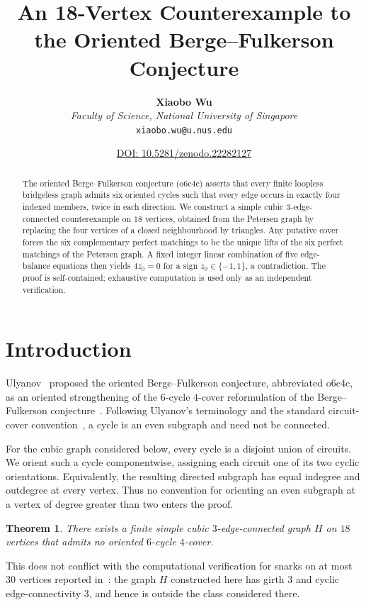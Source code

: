 \documentclass[11pt]{article}
\title{An 18-Vertex Counterexample to the
Oriented Berge--Fulkerson Conjecture}
\author{\textbf{Xiaobo Wu}\\
  \textit{Faculty of Science, National University of Singapore}\\
  \texttt{xiaobo.wu@u.nus.edu}}
\date{\small\href{https://doi.org/10.5281/zenodo.22282127}{DOI: 10.5281/zenodo.22282127}}
\newtheorem{theorem}{Theorem}[section]
\theoremstyle{definition}
\begin{document}
\maketitle

\begin{abstract}
The oriented Berge--Fulkerson conjecture (o6c4c) asserts that every finite
loopless bridgeless graph admits six oriented cycles such that every edge
occurs in exactly four indexed members, twice in each direction.  We construct
a simple cubic $3$-edge-connected counterexample on $18$ vertices, obtained
from the Petersen graph by replacing the four vertices of a closed
neighbourhood by triangles.  Any putative cover forces the six complementary
perfect matchings to be the unique lifts of the six perfect matchings of the
Petersen graph.  A fixed integer linear combination of five edge-balance
equations then yields $4z_0=0$ for a sign $z_0\in\{-1,1\}$, a contradiction.
The proof is self-contained; exhaustive computation is used only as an
independent verification.
\end{abstract}

\section{Introduction}

Ulyanov~\cite[Conjecture~1.1]{Ulyanov} proposed the oriented
Berge--Fulkerson conjecture, abbreviated o6c4c, as an oriented strengthening
of the $6$-cycle $4$-cover reformulation of the Berge--Fulkerson
conjecture~\cite{Fulkerson}.  Following Ulyanov's terminology and the standard
circuit-cover convention~\cite{Zhang}, a cycle is an even subgraph and need
not be connected.

For the cubic graph considered below, every cycle is a disjoint union of
circuits.  We orient such a cycle componentwise, assigning each circuit one
of its two cyclic orientations.  Equivalently, the resulting directed
subgraph has equal indegree and outdegree at every vertex.  Thus no convention
for orienting an even subgraph at a vertex of degree greater than two enters
the proof.

\begin{theorem}\label{thm:main}
There exists a finite simple cubic $3$-edge-connected graph $H$ on $18$
vertices that admits no oriented $6$-cycle $4$-cover.
\end{theorem}

This does not conflict with the computational verification for snarks on at
most $30$ vertices reported in~\cite[Section~2.3]{Ulyanov}: the graph $H$
constructed here has girth $3$ and cyclic edge-connectivity $3$, and hence is
outside the class considered there.
\end{document}
